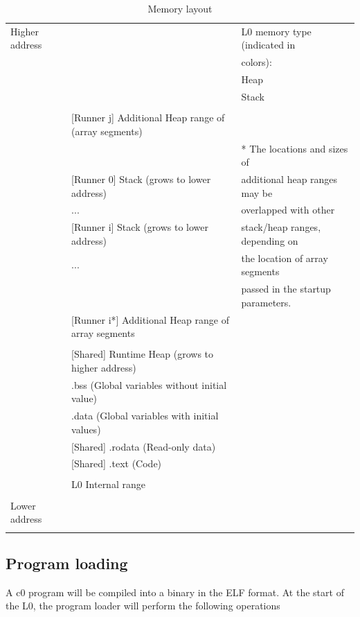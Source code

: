 \documentclass[a4paper]{article}
\begin{document}
\begin{table}[htbp]
\centering
\caption{Memory layout}
\begin{tabular}{|l|l|p{5cm}|}
\hline
Higher address & & L0 memory type (indicated in\\
 & & colors):\\\cline{1-2}
 & & Heap \\ \cline{1-1}
 & & Stack \\ \cline{1-1}
 & & \\ \cline{1-2}
 & [Runner j] Additional Heap range of (array segments) & \\ \cline{1-2}
 & & * The locations and sizes of\\ \cline{1-2}
 & [Runner 0] Stack (grows to lower address) & additional heap ranges may be\\\cline{1-2}
 & ... & overlapped with other\\\cline{1-2}
 & [Runner i] Stack (grows to lower address) & stack/heap ranges, depending on\\\cline{1-2}
 & ... & the location of array segments\\\cline{1-2}
 & & passed in the startup parameters.\\\cline{1-2}
 & [Runner i*] Additional Heap range of array segments & \\\cline{1-2}
 & & \\\cline{1-2}
 & [Shared] Runtime Heap (grows to higher address) & \\\cline{1-2}
 & .bss (Global variables without initial value) & \\\cline{1-2}
 & .data (Global variables with initial values) & \\\cline{1-2}
 & [Shared] .rodata (Read-only data) & \\\cline{1-2}
 & [Shared] .text (Code) & \\\cline{1-2}
 & & \\\cline{1-2}
 & L0 Internal range & \\\cline{1-2}
 & & \\\cline{1-2}
 Lower address & & \\
 & & \\\cline{1-2}
\hline
\end{tabular}
\label{table:c0-memory}
\end{table}

\subsection{Program loading}
A c0 program will be compiled into a binary in the ELF format. 
At the start of the L0, the program loader will perform the following operations
\end{document}
